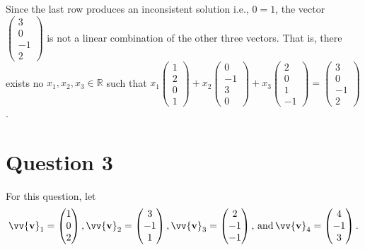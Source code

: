 \documentclass[12pt]{article}
\newcommand{\vect}[1]{\vv{\mathbf{#1}}}
\newcommand{\R}{\mathbb{R}}
\begin{document}
Since the last row produces an inconsistent solution i.e., $0=1$, the vector $\begin{pmatrix}
    3 \\ 0 \\ -1 \\ 2
\end{pmatrix}$ is not a linear combination of the other three vectors. That is, there exists no $x_1,x_2,x_3\in\R$ such that $x_1\begin{pmatrix}
    1 \\ 2 \\ 0 \\ 1
\end{pmatrix} + x_2\begin{pmatrix}
    0 \\ -1 \\ 3 \\ 0
\end{pmatrix} + x_3\begin{pmatrix}
    2 \\ 0 \\ 1 \\ -1
\end{pmatrix} = \begin{pmatrix}
    3 \\ 0 \\ -1 \\ 2
\end{pmatrix}$.

\section*{Question 3}

For this question, let 
$$
{\vect v}_1 = \begin{pmatrix} 1 \\ 0 \\ 2  \end{pmatrix}, 
{\vect v}_2 = \begin{pmatrix} 3 \\ -1 \\ 1  \end{pmatrix},
{\vect v}_3 = \begin{pmatrix} 2 \\ -1 \\ -1  \end{pmatrix}\text{, and}\,
{\vect v}_4 = \begin{pmatrix} 4 \\ -1\\ 3  \end{pmatrix}.
$$
\end{document}

